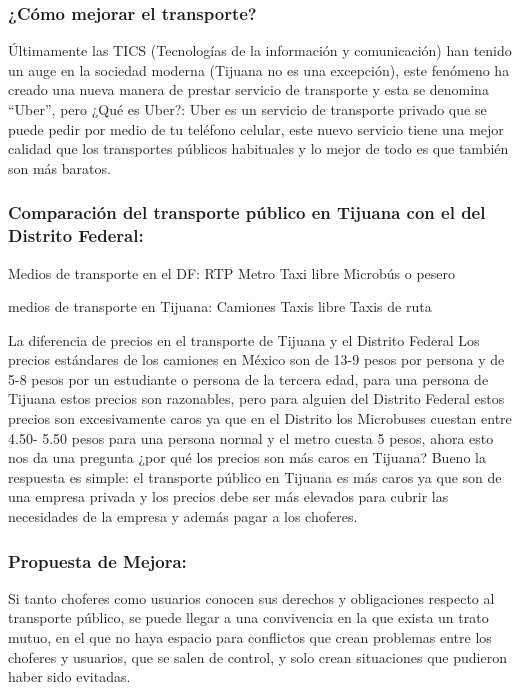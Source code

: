 \documentclass{bmcart}
\begin{document}
\subsubsection{¿Cómo mejorar el transporte?}
Últimamente las TICS (Tecnologías de la información y comunicación) han tenido un auge en la sociedad moderna (Tijuana no es una excepción), este fenómeno ha creado una nueva manera de prestar servicio de transporte y esta se denomina “Uber”, pero ¿Qué es Uber?: Uber es un servicio de transporte privado que se puede pedir por medio de tu teléfono celular, este nuevo servicio tiene una mejor calidad que los transportes públicos habituales y lo mejor de todo es que también son más baratos.

\subsubsection{Comparación del transporte público en Tijuana con el del Distrito Federal:}
Medios de transporte en el DF: 
RTP
Metro
Taxi libre
Microbús o pesero

medios de transporte en Tijuana: 
Camiones
Taxis libre
Taxis de ruta

La diferencia de precios en el transporte de Tijuana y el Distrito Federal
Los precios estándares de los camiones en México son de 13-9 pesos por persona y de 5-8 pesos por un estudiante o persona de la tercera edad, para una persona de Tijuana estos precios son razonables, pero para alguien del Distrito Federal estos precios son excesivamente caros ya que en el Distrito los Microbuses cuestan entre 4.50- 5.50 pesos para una persona normal y el metro cuesta 5 pesos, ahora esto nos da una pregunta ¿por qué los precios son más caros en Tijuana? Bueno la respuesta es simple: el transporte público en Tijuana es más caros ya que son de una empresa privada y los precios debe ser más elevados para cubrir las necesidades de la empresa y además pagar a los choferes.

\subsubsection{Propuesta de Mejora:}
Si tanto choferes como usuarios conocen sus derechos y obligaciones respecto al transporte público, se puede llegar a una convivencia en la que exista un trato mutuo, en el que no haya espacio para conflictos que crean problemas entre los choferes y usuarios, que se salen de control, y solo crean situaciones que pudieron haber sido evitadas.
\end{document}

